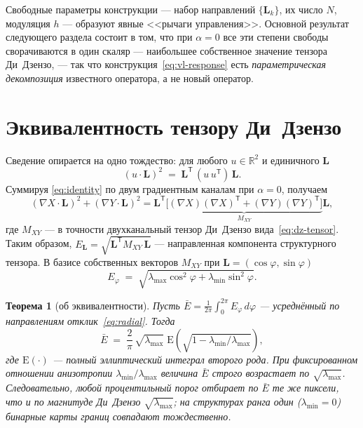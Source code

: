 \documentclass[11pt,a4paper]{article}
\theoremstyle{plain}
\newtheorem{theorem}{Теорема}
\theoremstyle{definition}
\theoremstyle{remark}
\newcommand{\Lvec}{\mathbf{L}}
\newcommand{\grad}{\nabla}
\newcommand{\lmax}{\lambda_{\max}}
\newcommand{\lmin}{\lambda_{\min}}
\newcommand{\Mxy}{M_{XY}}
\newcommand{\T}{^{\mathsf T}}
\begin{document}
Свободные параметры конструкции --- набор направлений $\{\Lvec_k\}$, их
число $N$, модуляция $h$ --- образуют явные <<рычаги управления>>. Основной
результат следующего раздела состоит в том, что при $\alpha = 0$ все эти
степени свободы сворачиваются в один скаляр --- наибольшее собственное
значение тензора Ди~Дзензо, --- так что конструкция~\eqref{eq:vl-response}
есть \emph{параметрическая декомпозиция} известного оператора, а не новый
оператор.

\section{Эквивалентность тензору Ди~Дзензо}
\label{sec:equiv}

Сведение опирается на одно тождество: для любого $u \in \mathbb R^2$ и
единичного $\Lvec$
\begin{equation}
\label{eq:identity}
(u \cdot \Lvec)^2 \;=\; \Lvec\T\,(u\,u\T)\,\Lvec .
\end{equation}
Суммируя \eqref{eq:identity} по двум градиентным каналам при $\alpha = 0$,
получаем
\begin{equation}
\label{eq:quadform}
(\grad X \cdot \Lvec)^2 + (\grad Y \cdot \Lvec)^2
=
\Lvec\T
\underbrace{\bigl[(\grad X)(\grad X)\T + (\grad Y)(\grad Y)\T\bigr]}_{\Mxy}
\Lvec ,
\end{equation}
где $\Mxy$ --- в точности двухканальный тензор Ди~Дзензо
вида~\eqref{eq:dz-tensor}. Таким образом,
$E_{\Lvec} = \sqrt{\Lvec\T \Mxy\, \Lvec}$ --- направленная компонента
структурного тензора. В базисе собственных векторов $\Mxy$ при
$\Lvec = (\cos\varphi, \sin\varphi)$
\begin{equation}
\label{eq:radial}
E_\varphi \;=\; \sqrt{\lmax \cos^2\varphi + \lmin \sin^2\varphi}.
\end{equation}

\begin{theorem}[об эквивалентности]
\label{thm:equiv}
Пусть $\bar E = \frac{1}{2\pi}\int_0^{2\pi} E_\varphi\, d\varphi$ ---
усреднённый по направлениям отклик~\eqref{eq:radial}. Тогда
\begin{equation}
\label{eq:elliptic}
\bar E \;=\; \frac{2}{\pi}\,\sqrt{\lmax}\;
\mathrm{E}\!\left(\sqrt{1 - \lmin/\lmax}\right),
\end{equation}
где $\mathrm{E}(\cdot)$ --- полный эллиптический интеграл второго рода. При
фиксированном отношении анизотропии $\lmin/\lmax$ величина $\bar E$ строго
возрастает по $\sqrt{\lmax}$. Следовательно, любой процентильный порог
отбирает по $\bar E$ те же пиксели, что и по магнитуде Ди~Дзензо
$\sqrt{\lmax}$; на структурах ранга один ($\lmin = 0$) бинарные карты границ
совпадают тождественно.
\end{theorem}
\end{document}
